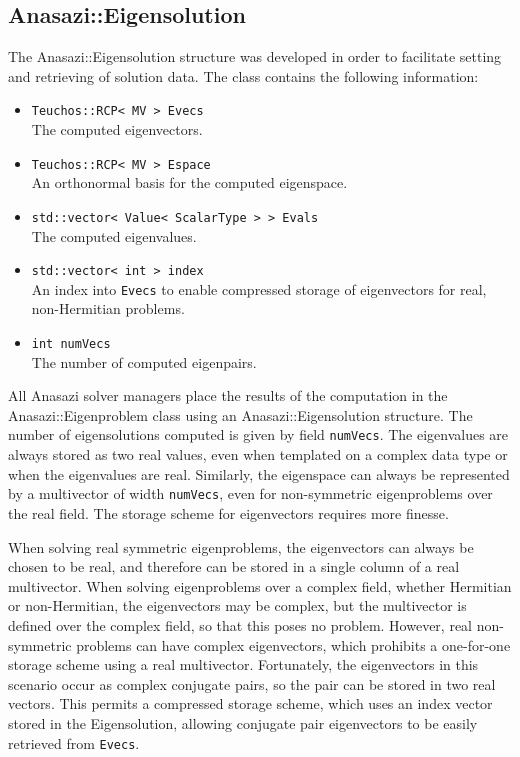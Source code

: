 \subsection{Anasazi::Eigensolution}
\label{sec:anasazi:eigensolution}

The Anasazi::Eigensolution structure was developed in order to facilitate setting
and retrieving of solution data. The class contains the following information:
\begin{itemize}
  \item \verb!Teuchos::RCP< MV > Evecs! \\ 
   The computed eigenvectors.
 \item \verb!Teuchos::RCP< MV > Espace! \\ 
   An orthonormal basis for the computed eigenspace.
 \item \verb!std::vector< Value< ScalarType > > Evals! \\ 
   The computed eigenvalues.
 \item \verb!std::vector< int > index! \\ 
   An index into \verb!Evecs! to enable compressed storage of eigenvectors for real, non-Hermitian problems.
 \item \verb!int numVecs! \\
   The number of computed eigenpairs.
\end{itemize}

All Anasazi solver managers place the results of the computation in the
Anasazi::Eigen\-problem class using an Anasazi::Eigensolution structure. The number of
eigensolutions computed is given by field \verb!numVecs!. The eigenvalues are
always stored as two real values, even when templated on a complex data type or when the eigenvalues
are real. Similarly, the eigenspace can always be represented by a multivector of width
\verb!numVecs!, even for non-symmetric eigenproblems over the real field. The storage
scheme for eigenvectors requires more finesse.

When solving real symmetric eigenproblems, the eigenvectors can always be chosen to be
real, and therefore can be stored in a single column of a real multivector. When solving
eigenproblems over a complex field, whether Hermitian or non-Hermitian, the eigenvectors
may be complex, but the multivector is defined over the complex field, so that this poses
no problem. However, real non-symmetric problems can have complex eigenvectors, which
prohibits a one-for-one storage scheme using a real multivector.  Fortunately, the
eigenvectors in this scenario occur as complex conjugate pairs, so the pair can be stored
in two real vectors. This permits a compressed storage scheme, which uses an index vector
stored in the Eigensolution, allowing conjugate pair eigenvectors to be easily retrieved
from \verb!Evecs!. 

